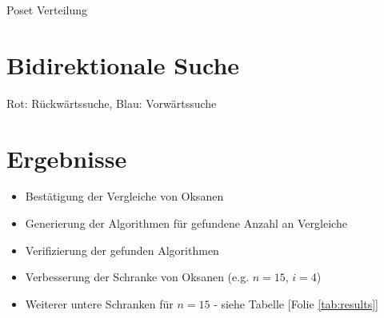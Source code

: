 \begin{frame}{Poset Verteilung}
  \begin{figure}[!b]
    \centering
    
  \end{figure}
\end{frame}


\section{Bidirektionale Suche}
\sectionframe{\insertsection}
\begin{frame}{\insertsection}
\end{frame}

\begin{frame}{\insertsection}
  \begin{figure}[!b]
    \centering
    
  \end{figure}

  {\color{red} Rot: Rückwärtssuche},
  {\color{blue} Blau: Vorwärtssuche}

\end{frame}


\section{Ergebnisse}
\sectionframe{\insertsection}

\begin{frame}{\insertsection}
  \begin{itemize}
    \item Bestätigung der Vergleiche von Oksanen
    \item Generierung der Algorithmen für gefundene Anzahl an Vergleiche
    \item Verifizierung der gefunden Algorithmen
    \item Verbesserung der Schranke von Oksanen (e.g. $n=15$, $i=4$)
    \item Weiterer untere Schranken für $n=15$ - siehe Tabelle [Folie \ref{tab:results}]
  \end{itemize}

\end{frame}

